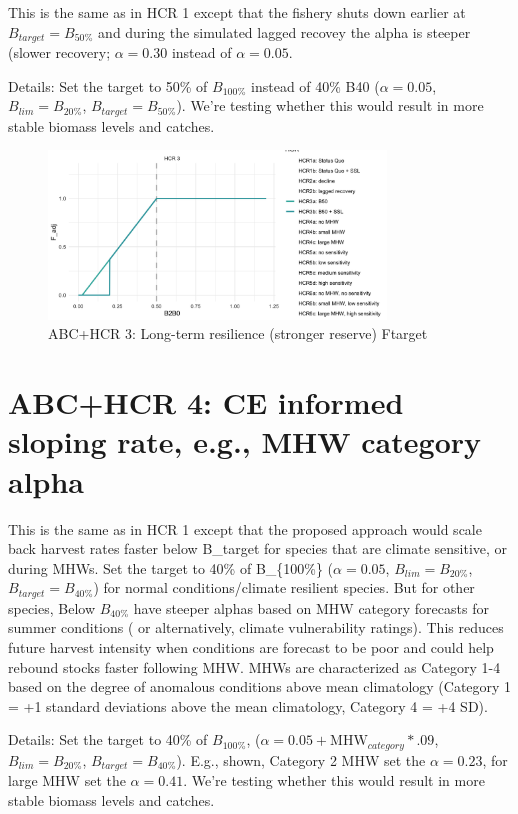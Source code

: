 \documentclass[
]{article}
\begin{document}
This is the same as in HCR 1 except that the fishery shuts down earlier
at \(B_{target} = B_{50\%}\) and during the simulated lagged recovey the
alpha is steeper (slower recovery; \(\alpha = 0.30\) instead of
\(\alpha = 0.05\).

Details: Set the target to 50\% of \(B_{100\%}\) instead of 40\% B40
(\(\alpha = 0.05\), \(B_{lim} = B_{20\%}\), \(B_{target} = B_{50\%}\)).
We're testing whether this would result in more stable biomass levels
and catches.

\begin{figure}
\centering
\includegraphics[width=0.8\textwidth,height=\textheight]{../../Figs/HCR_figs/HCR3.png}
\caption{ABC+HCR 3: Long-term resilience (stronger reserve) Ftarget}
\end{figure}

\section{ABC+HCR 4: CE informed sloping rate, e.g., MHW category
alpha}\label{abchcr-4-ce-informed-sloping-rate-e.g.-mhw-category-alpha}

This is the same as in HCR 1 except that the proposed approach would
scale back harvest rates faster below B\_target for species that are
climate sensitive, or during MHWs. Set the target to 40\% of
B\_\{100\%\} (\(\alpha = 0.05\), \(B_{lim} = B_{20\%}\),
\(B_{target} = B_{40\%}\)) for normal conditions/climate resilient
species. But for other species, Below \(B_{40\%}\) have steeper alphas
based on MHW category forecasts for summer conditions ( or
alternatively, climate vulnerability ratings). This reduces future
harvest intensity when conditions are forecast to be poor and could help
rebound stocks faster following MHW. MHWs are characterized as Category
1-4 based on the degree of anomalous conditions above mean climatology
(Category 1 = +1 standard deviations above the mean climatology,
Category 4 = +4 SD).

Details: Set the target to 40\% of \(B_{100\%}\),
(\(\alpha = 0.05+\mathrm{MHW}_{category}*.09\), \(B_{lim} = B_{20\%}\),
\(B_{target} = B_{40\%}\)). E.g., shown, Category 2 MHW set the
\(\alpha = 0.23\), for large MHW set the \(\alpha = 0.41\). We're
testing whether this would result in more stable biomass levels and
catches.
\end{document}
